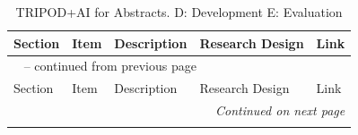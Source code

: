 \documentclass{article}
\begin{document}
\begin{longtable}{p{} l p{} l l}
    \caption{TRIPOD+AI for Abstracts. D: Development E: Evaluation}
    \label{tab:TRIPOD-AI-Abstract}\\

    \toprule
    Section & Item & Description & Research Design & Link \\
    \midrule
    \endfirsthead

    \multicolumn{5}{l}{\tablename~\thetable{} -- continued from previous page}\\
    \toprule
    Section & Item & Description & Research Design & Link \\
    \midrule
    \endhead

    \midrule
    \multicolumn{5}{r}{\emph{Continued on next page}}\\
    \endfoot

    \bottomrule
    \endlastfoot



\end{longtable}
\end{document}
